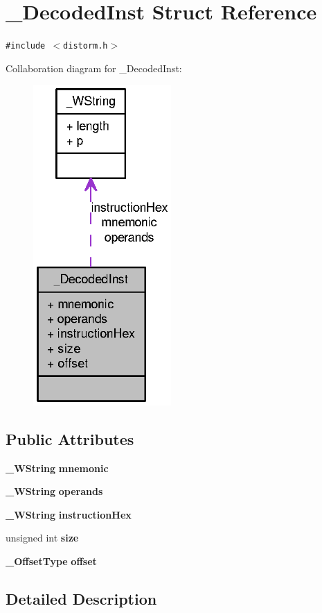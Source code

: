 \section{\_\-DecodedInst Struct Reference}
\label{struct__DecodedInst}
{\tt \#include $<$distorm.h$>$}

Collaboration diagram for \_\-DecodedInst:\nopagebreak
\begin{figure}[H]
\begin{center}
\leavevmode
\includegraphics[width=149pt]{struct__DecodedInst__coll__graph}
\end{center}
\end{figure}
\subsection*{Public Attributes}
\begin{CompactItemize}
\item 
{\bf \_\-WString} {\bf mnemonic}
\item 
{\bf \_\-WString} {\bf operands}
\item 
{\bf \_\-WString} {\bf instructionHex}
\item 
unsigned int {\bf size}
\item 
{\bf \_\-OffsetType} {\bf offset}
\end{CompactItemize}


\subsection{Detailed Description}


